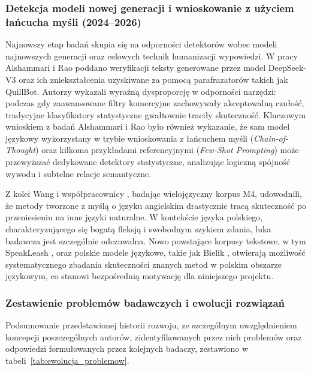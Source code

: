 \subsubsection{Detekcja modeli nowej generacji i wnioskowanie z użyciem łańcucha myśli (2024--2026)}

Najnowszy etap badań skupia się na odporności detektorów wobec modeli najnowszych generacji oraz celowych technik humanizacji wypowiedzi. W pracy Alshammari i Rao \cite{alshammari2025evaluating} poddano weryfikacji teksty generowane przez model DeepSeek-V3 oraz ich zniekształcenia uzyskiwane za pomocą parafrazatorów takich jak QuillBot. Autorzy wykazali wyraźną dysproporcję w odporności narzędzi: podczas gdy zaawansowane filtry komercyjne zachowywały akceptowalną czułość, tradycyjne klasyfikatory statystyczne gwałtownie traciły skuteczność. Kluczowym wnioskiem z badań Alshammari i Rao było również wykazanie, że sam model językowy wykorzystany w trybie wnioskowania z łańcuchem myśli (\textit{Chain-of-Thought}) oraz kilkoma przykładami referencyjnymi (\textit{Few-Shot Prompting}) może przewyższać dedykowane detektory statystyczne, analizując logiczną spójność wywodu i subtelne relacje semantyczne.

Z kolei Wang i współpracownicy \cite{wang2023m4}, badając wielojęzyczny korpus M4, udowodnili, że metody tworzone z myślą o języku angielskim drastycznie tracą skuteczność po przeniesieniu na inne języki naturalne. W kontekście języka polskiego, charakteryzującego się bogatą fleksją i swobodnym szykiem zdania, luka badawcza jest szczególnie odczuwalna. Nowo powstające korpusy tekstowe, w tym SpeakLeash \cite{speakleash2024}, oraz polskie modele językowe, takie jak Bielik \cite{bielik2024}, otwierają możliwość systematycznego zbadania skuteczności znanych metod w polskim obszarze językowym, co stanowi bezpośrednią motywację dla niniejszego projektu.

\subsubsection{Zestawienie problemów badawczych i ewolucji rozwiązań}

Podsumowanie przedstawionej historii rozwoju, ze szczególnym uwzględnieniem koncepcji poszczególnych autorów, zidentyfikowanych przez nich problemów oraz odpowiedzi formułowanych przez kolejnych badaczy, zestawiono w tabeli~\ref{tab:ewolucja_problemow}.

